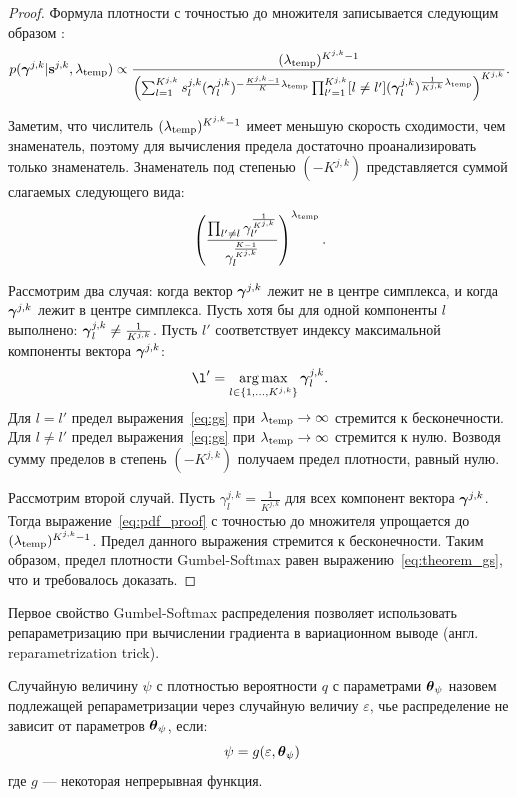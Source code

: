 \begin{proof} 
Формула плотности с точностью до множителя записывается следующим образом :
\begin{equation}
\label{eq:pdf_proof}
    p(\boldsymbol{\gamma}^{j,k}|\mathbf{s}^{j,k}, \lambda_{\text{temp}}) \propto    \frac{(\lambda_{\text{temp}})^{K^{j,k}-1}}{\left(\sum_{l=1}^{K^{j,k}} s^{j,k}_l(\boldsymbol{\gamma}^{j,k}_l)^{-\frac{K^{j,k}-1}{K}\lambda_{\text{temp}}}\prod_{l'=1}^{K^{j,k}} [l \neq l'](\boldsymbol{\gamma}_l^{j,k})^{\frac{1}{K^{j,k}}\lambda_{\text{temp}}}\right)^{K^{j,k}}}.
\end{equation}

Заметим, что числитель $(\lambda_{\text{temp}})^{K^{j,k}-1}$ имеет меньшую скорость сходимости, чем знаменатель, поэтому для вычисления предела достаточно проанализировать только знаменатель. Знаменатель под степенью $(-K^{j,k})$ представляется суммой слагаемых следующего вида: 
\begin{equation}
\label{eq:gs}
    \left(\frac{\prod_{l' \neq l} \gamma_{l'}^{\frac{1}{K^{j,k}}}}{\gamma_l^{\frac{K-1}{K^{j,k}}}}\right)^{\lambda_{\text{temp}}}.
\end{equation}

Рассмотрим два случая: когда вектор $\boldsymbol{\gamma}^{j,k}$  лежит не в центре симплекса, и когда  $\boldsymbol{\gamma}^{j,k}$ лежит в центре симплекса. 
Пусть хотя бы для одной компоненты $l$ выполнено: $\boldsymbol{\gamma}^{j,k}_l \neq \frac{1}{K^{j,k}}$. Пусть $l'$ соответствует индексу максимальной компоненты вектора $\boldsymbol{\gamma}^{j,k}$:
\[
    \l' = \argmax_{l \in \{1,\dots,K^{j,k}\}} \g^{j,k}_l.
\]
Для $l=l'$ предел выражения~\eqref{eq:gs} при $\lambda_{\text{temp}} \to \infty$ стремится к бесконечности. Для $l\neq l'$ предел выражения~\eqref{eq:gs} при $\lambda_{\text{temp}} \to \infty$ стремится к нулю. Возводя сумму пределов в степень $(-K^{j,k})$ получаем предел плотности, равный нулю.

Рассмотрим второй случай. Пусть ${\gamma}^{j,k}_l = \frac{1}{K^{j,k}}$ для всех компонент вектора $\boldsymbol{\gamma}^{j,k}$.
Тогда выражение~\eqref{eq:pdf_proof} с точностью до множителя упрощается до $(\lambda_{\text{temp}})^{K^{j,k}-1}$. Предел данного выражения стремится к бесконечности.
Таким образом, предел плотности Gumbel-Softmax равен выражению~\eqref{eq:theorem_gs}, что и требовалось доказать.

\end{proof}


Первое свойство Gumbel-Softmax распределения позволяет использовать репараметризацию при вычислении градиента в вариационном выводе (англ. reparametrization trick). 
\begin{defin} Случайную величину  $\psi$ с плотностью вероятности $q$ с параметрами $\boldsymbol{\theta}_\psi$ назовем подлежащей репараметризации через случайную величиу $\varepsilon$, чье распределение не зависит от параметров $\boldsymbol{\theta}_\psi$, если:
\[
   \psi = g(\varepsilon, \teta_\psi)
\]
где  $g$ --- некоторая непрерывная функция.
\end{defin}

